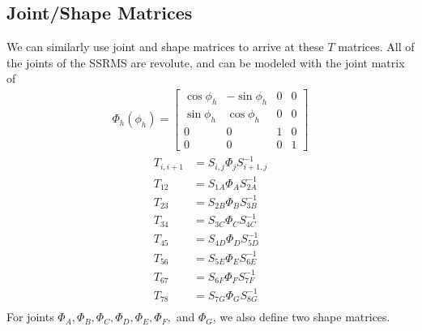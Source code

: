 \documentclass{article}
\begin{document}
\subsection{Joint/Shape Matrices}
We can similarly use joint and shape matrices to arrive at these $T$ matrices. All of the joints of the SSRMS are revolute, and can be modeled with the joint matrix of
\begin{align*}
\Phi_h \left( \phi_h \right) =
\left[\begin{matrix}
\cos \phi_h & -\sin \phi_h & 0 & 0 \\
\sin \phi_h & \cos \phi_h & 0 & 0 \\
0 & 0 & 1 & 0 \\
0 & 0 & 0 & 1
\end{matrix}\right]
\end{align*}
\begin{align*}
T_{i,i+1} &= S_{i, j} \Phi_j S_{i+1,j}^{-1} \\
T_{12} &= S_{1A} \Phi_A S_{2A}^{-1} \\
T_{23} &= S_{2B} \Phi_B S_{3B}^{-1} \\
T_{34} &= S_{3C} \Phi_C S_{4C}^{-1} \\
T_{45} &= S_{4D} \Phi_D S_{5D}^{-1} \\
T_{56} &= S_{5E} \Phi_E S_{6E}^{-1} \\
T_{67} &= S_{6F} \Phi_F S_{7F}^{-1} \\
T_{78} &= S_{7G} \Phi_G S_{8G}^{-1} \\
\end{align*}
For joints $\Phi_A, \Phi_B, \Phi_C, \Phi_D, \Phi_E, \Phi_F,$ and $\Phi_G$, we also define two shape matrices.
\end{document}
